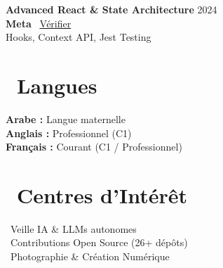\documentclass[a4paper,9pt]{extarticle}
\def\faLanguage{}%
\def\faHeart{}%
\def\faExternalLink*{}%
\begin{document}
\begin{minipage}[t]{0.405\textwidth}
  \vspace{2.5pt}
  \textbf{\color{primary}\small Advanced React \& State Architecture} \hfill {\scriptsize\color{textmuted} 2024}\\
  {\footnotesize \textbf{Meta} \textbar\ \href{https://www.coursera.org/account/accomplishments/verify/EOQZZ5AJA4PN}{Vérifier \faExternalLink*}}\\
  {\scriptsize\color{textdark} Hooks, Context API, Jest Testing}

  \vspace{3pt}

  \section{\faLanguage\ Langues}
  {\footnotesize
    \textbf{Arabe :} Langue maternelle\\[1pt]
    \textbf{Anglais :} Professionnel (C1)\\[1pt]
    \textbf{Français :} Courant (C1 / Professionnel)
  }

  \vspace{3pt}

  \section{\faHeart\ Centres d'Intérêt}
  {\footnotesize
    \faRobot\ Veille IA \& LLMs autonomes\\[1pt]
    \faCodeBranch\ Contributions Open Source (26+ dépôts)\\[1pt]
    \faCamera\ Photographie \& Création Numérique
  }

\end{minipage}
\end{document}
